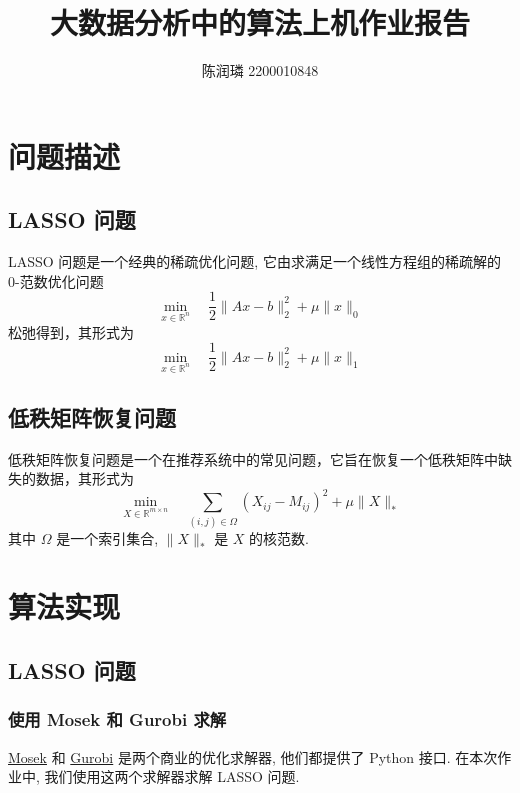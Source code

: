 \documentclass{article}
\title{大数据分析中的算法上机作业报告}
\author{陈润璘 2200010848}
\begin{document}
\maketitle

\section{问题描述}

\subsection{LASSO 问题}

LASSO 问题是一个经典的稀疏优化问题, 它由求满足一个线性方程组的稀疏解的 0-范数优化问题
\begin{equation*}
    \min_{x \in \mathbb{R}^n}\quad \frac{1}{2} \|Ax - b\|_2^2 + \mu \|x\|_0
\end{equation*}
松弛得到，其形式为
\begin{equation*}
    \min_{x \in \mathbb{R}^n}\quad \frac{1}{2} \|Ax - b\|_2^2 + \mu \|x\|_1
\end{equation*}

\subsection{低秩矩阵恢复问题}

低秩矩阵恢复问题是一个在推荐系统中的常见问题，它旨在恢复一个低秩矩阵中缺失的数据，其形式为
\begin{equation*}
    \min_{X \in \mathbb{R}^{m\times n}}\quad \sum_{(i,j)\in \Omega} (X_{ij} - M_{ij})^2 + \mu \|X\|_*
\end{equation*}
其中 $\Omega$ 是一个索引集合, $\|X\|_*$ 是 $X$ 的核范数.

\section{算法实现}

\subsection{LASSO 问题}

\subsubsection{使用 Mosek 和 Gurobi 求解}

\href{https://www.mosek.com/}{Mosek} 和 \href{https://www.gurobi.com/}{Gurobi} 是两个商业的优化求解器, 他们都提供了 Python 接口. 在本次作业中, 我们使用这两个求解器求解 LASSO 问题.
\end{document}
